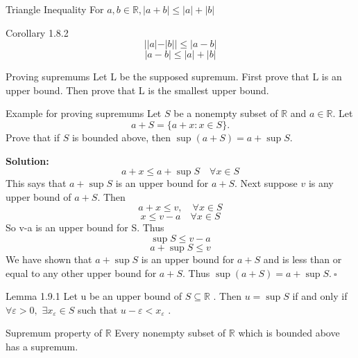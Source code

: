 \documentclass[10pt,landscape]{article}
\theoremstyle{definition}
\newcommand{\thistheoremname}{}
\newtheorem*{genericthm*}{\thistheoremname}
\newenvironment{namedthm*}[1]
{\renewcommand{\thistheoremname}{#1}\begin{genericthm*}}
{\end{genericthm*}}
\begin{document}
\begin{multicols}{3}
\begin{namedthm*}{Triangle Inequality}
  For $a, b \in \mathbb{R},|a+b| \leq|a|+|b|$
\end{namedthm*}

\begin{namedthm*}{Corollary 1.8.2}
   $$| | a|-| b| | \leq|a-b|$$
  $$|a-b| \leq|a|+|b|$$
\end{namedthm*}

\begin{namedthm*}{Proving supremums}
     Let L be the supposed supremum. First prove that L is an upper bound. Then prove that L is the smallest upper bound.
\end{namedthm*}

\begin{namedthm*}{Example for proving supremums}
   Let $S$ be a nonempty subset of $\mathbb{R}$ and $a \in \mathbb{R} .$ Let
$$
a+S=\{a+x : x \in S\}.
$$
Prove that if $S$ is bounded above, then $\sup (a+S)=a+\sup S$.

\textbf{Solution:}
\begin{equation}
a+x \leq a+\sup S \quad \forall x \in S
\end{equation}
This says that $a+\sup S$ is an upper bound for $a+S$. Next suppose $v$ is any upper bound of $a+S .$ Then
\begin{equation}
a+x \leq v, \quad \forall x \in S
\end{equation}
\begin{equation}
x \leq v-a \quad \forall x \in S
\end{equation}
So v-a is an upper bound for S. Thus
\begin{equation}
\sup S \leq v-a
\end{equation}
\begin{equation}
a+\sup S \leq v
\end{equation}
We have shown that $a+\sup S$ is an upper bound for $a+S$ and is less than or equal to any other
upper bound for $a+S .$ Thus $\sup (a+S)=a+\sup S .~ \square$
\end{namedthm*}

\begin{namedthm*}{Lemma 1.9.1}
 Let u be an upper bound of $S \subseteq \mathbb{R}$ . Then $u=\sup S$ if and only if $\forall \varepsilon>0,$
$\exists x_{\varepsilon} \in S$ such that $u-\varepsilon<x_{\varepsilon}$ .
\end{namedthm*}

\begin{namedthm*}{Supremum property of $\mathbb{R}$}
  Every nonempty subset of $\mathbb{R}$ which is bounded above has a supremum.
\end{namedthm*}


\end{multicols}
\end{document}
